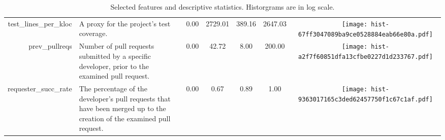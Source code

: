 \begin{table*}[ht]
\begin{tabular}{rp{15em}ccccc}
  test\_lines\_per\_kloc & A proxy for the project's test coverage. & 0.00 & 2729.01 & 389.16 & 2647.03 & \texttt{[image: hist-67ff3047089ba9ce0528884eab66e80a.pdf]} \\ 
  prev\_pullreqs & Number of pull requests submitted by a specific developer, prior to the examined pull request. & 0.00 & 42.72 & 8.00 & 200.00 & \texttt{[image: hist-a2f7f60851dfa13cfbe0227d1d233767.pdf]} \\ 
  requester\_succ\_rate & The percentage of the developer's pull requests that have been merged up to the creation of the examined pull request. & 0.00 & 0.67 & 0.89 & 1.00 & \texttt{[image: hist-9363017165c3ded62457750f1c67c1af.pdf]} \\ 
   \hline
\end{tabular}
\caption{Selected features and descriptive statistics. Historgrams are in log scale.} 
\label{tab:features}
\end{table*}
